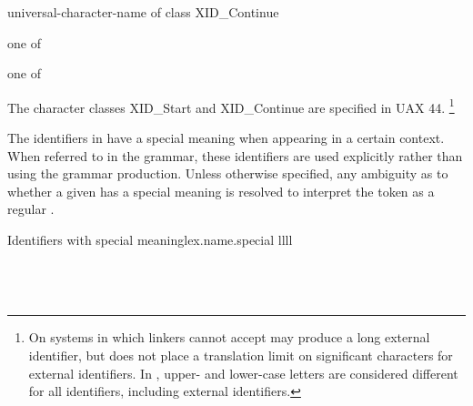 \documentclass{wg21}
\begin{document}
\begin{bnf}
    \br
    \br
    \br
    universal-character-name of class XID_Continue
\end{bnf}

\begin{bnf}
    \begin{removedblock}
     \textnormal{one of}\br
    \br
    \br
    \br
\end{removedblock}
\end{bnf}

\begin{bnf}
     \textnormal{one of}\br
\end{bnf}

\pnum
{}%
%
The character classes XID_Start and XID_Continue are specified in UAX 44.
\footnote{On systems in which linkers cannot accept  may produce a long external identifier, but \Cpp{} does not
    place a translation limit on significant characters for external
    identifiers. In \Cpp{}, upper- and lower-case letters are considered
    different for all identifiers, including external identifiers. }

\pnum
{}%
%
%
%
The identifiers in  have a special meaning when
appearing in a certain context. When referred to in the grammar, these identifiers
are used explicitly rather than using the  grammar production.
Unless otherwise specified, any ambiguity as to whether a given
 has a special meaning is resolved to interpret the
token as a regular .

\begin{multicolfloattable}{Identifiers with special meaning}{lex.name.special}
    {llll}
               \\
    \columnbreak
              \\
    \columnbreak
              \\
    \columnbreak
            \\
\end{multicolfloattable}
\end{document}
